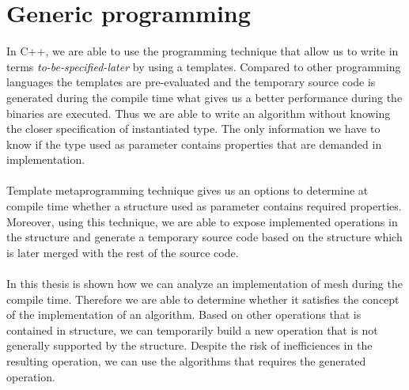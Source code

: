 \section{Generic programming}

In C++, we are able to use the programming technique that allow us to write in terms
\emph{to-be-specified-later} by using a templates. Compared to other programming languages
the templates are pre-evaluated and the temporary source code is generated during the
compile time what gives us a better performance during the binaries are executed.
Thus we are able to write an algorithm
without knowing the closer specification of instantiated type. The only information we have
to know if the type used as parameter contains properties that are demanded in implementation.\\
\\
Template metaprogramming technique gives us an options to determine at compile time whether
a structure used as parameter contains required properties. Moreover, using this technique,
we are able to expose implemented operations in the structure and generate a temporary source
code based on the structure which is later merged with the rest of the source code.\\
\\
In this thesis is shown how we can analyze an implementation of mesh during the compile time.
Therefore we are able to determine whether it satisfies the concept of the implementation of
an algorithm. Based on other operations that is contained in structure, we can temporarily build a new
operation that is not generally supported by the structure. Despite the risk of inefficiences in
the resulting operation, we can use the algorithms that requires the generated operation.

